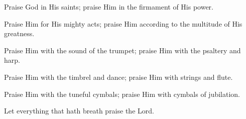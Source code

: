 Praise God in His saints; praise Him in the firmament of His power.

Praise Him for His mighty acts; praise Him according to the multitude of His greatness.

Praise Him with the sound of the trumpet; praise Him with the psaltery and harp.

Praise Him with the timbrel and dance; praise Him with strings and flute.

Praise Him with the tuneful cymbals; praise Him with cymbals of jubilation.

Let everything that hath breath praise the Lord.
